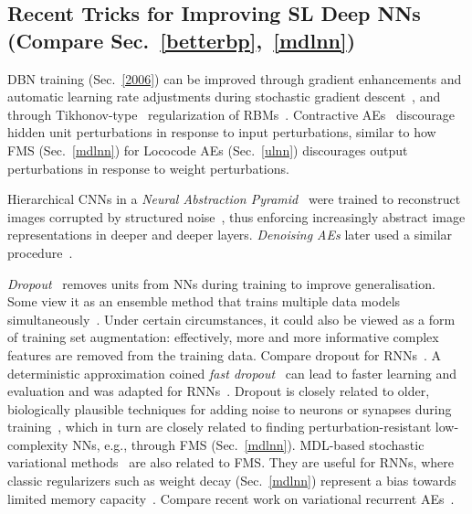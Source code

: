 \documentclass[letterpaper]{article}
\begin{document}
\begin{sloppypar}
\subsection{Recent Tricks for Improving SL Deep NNs (Compare Sec.~\ref{betterbp},~\ref{mdlnn})}
\label{tricks}

DBN training (Sec.~\ref{2006}) can be improved through gradient enhancements and
automatic  learning rate adjustments during stochastic gradient descent~\citep{cho2013,cho2014}, and through 
Tikhonov-type~\citep{tikhonov1977} regularization of RBMs~\citep{cho2012}.
Contractive AEs~\citep{vincent2011} 
discourage hidden unit perturbations in response to input perturbations, 
similar to how FMS (Sec.~\ref{mdlnn}) for {\sc Lococode} AEs (Sec.~\ref{ulnn}) 
discourages output perturbations in response to weight perturbations.

Hierarchical CNNs in a {\em Neural Abstraction Pyramid}~\citep[e.g.,][]{Behnke:LNCS,Behnke:NCA}
were trained to 
 reconstruct images corrupted by structured noise~\citep{Behnke:IJCIA2001},
thus enforcing increasingly abstract image representations in 
deeper and deeper layers.
{\em Denoising AEs} later used a similar procedure~\citep{vincent:2008}.


{\em Dropout}~\citep{Hinton2012,frey2013}  removes units from NNs during training to improve generalisation. Some view it as an ensemble method that trains multiple data models simultaneously~\citep{baldidropout2014}. 
Under certain circumstances, 
it could also be viewed as a form of training set augmentation: 
effectively, more and more informative complex features are removed from the training data. 
Compare dropout for RNNs~\citep{Pham2013,pachitariu2013regularization,pascanu2013construct}. 
A deterministic approximation coined {\em fast dropout}~\citep{wang2013fast} can lead to faster learning and evaluation and was adapted for RNNs~\citep{bayer2013fast}.
Dropout is closely related to older, biologically plausible techniques 
for adding noise to neurons 
or synapses during training~\citep[e.g.,][]{hanson1990,Murray:93,Schuster:92,Nadal:94,giles95,an96},
which in turn are closely related to finding perturbation-resistant low-complexity NNs,
e.g., through FMS (Sec.~\ref{mdlnn}).
MDL-based stochastic variational methods~\citep{Graves2011} 
are also related to FMS.
They are useful for RNNs, where classic regularizers such as  weight decay
(Sec.~\ref{mdlnn}) represent a 
bias towards limited memory capacity~\citep[e.g.,][]{pascanu2013}. 
Compare recent work on variational recurrent AEs~\citep{bayer2014variational}.


\end{sloppypar}
\end{document}
